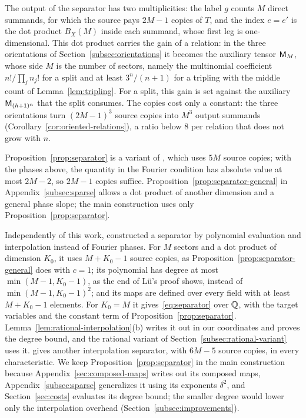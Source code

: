 The output of the separator has two multiplicities: the label \(g\)
counts \(M\) direct summands, for which the source pays \(2M-1\) copies of
\(T\), and the index \(e=e'\) is the dot product \(B_X(M)\) inside each
summand, whose first leg is one-dimensional. This dot product carries the
gain of a relation: in the three orientations of
Section~\ref{subsec:orientations} it becomes the auxiliary tensor
\(\mathsf M_M\), whose side \(M\) is the number of sectors, namely the
multinomial coefficient \(n!/\prod_jn_j!\) for a split and at least
\(3^n/(n+1)\) for a tripling with the middle count of
Lemma~\ref{lem:tripling}. For a split, this gain is set against the
auxiliary \(\mathsf M_{(h+1)^n}\) that the split consumes. The copies cost only
a constant: the three orientations turn \((2M-1)^3\) source copies into
\(M^3\) output summands (Corollary~\ref{cor:oriented-relations}), a ratio
below \(8\) per relation that does not grow with \(n\).

Proposition~\ref{prop:separator} is a variant of
\citet[Proposition~3.1]{OAI26}, which uses \(5M\) source copies; with the
phases above, the quantity in the Fourier condition has absolute value at
most \(2M-2\), so \(2M-1\) copies suffice.
Proposition~\ref{prop:separator-general} in Appendix~\ref{subsec:sparse}
allows a dot product of another dimension and a general phase slope; the
main construction uses only Proposition~\ref{prop:separator}.

\begin{remark}\label{rem:polynomial-separator}
Independently of this work, \citet[Proposition~2.1]{Lu26} constructed a
separator by polynomial evaluation and interpolation instead of Fourier
phases. For \(M\) sectors and a dot product of dimension \(K_0\), it
uses \(M+K_0-1\) source copies, as Proposition~\ref{prop:separator-general}
does with \(c=1\); its polynomial has degree at most
\(\min(M-1,K_0-1)\), as the end of L\"u's proof shows, instead of
\(\min(M-1,K_0-1)^2\); and its maps are defined over every field with at
least \(M+K_0-1\) elements. For \(K_0=M\) it gives~\eqref{eq:separator}
over \(\mathbb Q\), with the target variables and the constant term of
Proposition~\ref{prop:separator}. Lemma~\ref{lem:rational-interpolation}(b)
writes it out in our coordinates and proves the degree bound, and the
rational variant of Section~\ref{subsec:rational-variant} uses it.
\citet[Lemma~2.5]{Fil26} gives another interpolation separator, with
\(6M-5\) source copies, in every characteristic. We keep
Proposition~\ref{prop:separator} in the main construction because
Appendix~\ref{sec:composed-maps} writes out its composed maps,
Appendix~\ref{subsec:sparse} generalizes it using its exponents
\(\delta^2\), and Section~\ref{sec:costs} evaluates its degree bound;
the smaller degree would lower only the interpolation overhead
(Section~\ref{subsec:improvements}).
\end{remark}

